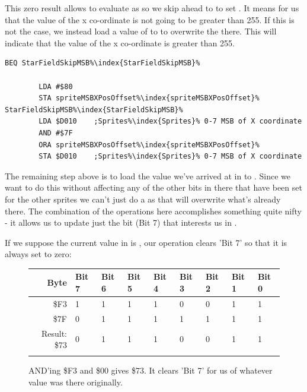This zero result allows  to evaluate as  so we skip ahead to 
to set .
It means for us that the value of the x co-ordinate is not going to be greater than 255. If this is not the case, we instead load a value of
 to  to overwrite the  there. This will indicate that the value of the x co-ordinate
is greater than 255.

\begin{lstlisting}[escapechar=\%]
        BEQ StarFieldSkipMSB%\index{StarFieldSkipMSB}%

        LDA #$80
        STA spriteMSBXPosOffset%\index{spriteMSBXPosOffset}%
StarFieldSkipMSB%\index{StarFieldSkipMSB}%   
        LDA $D010    ;Sprites%\index{Sprites}% 0-7 MSB of X coordinate
        AND #$7F
        ORA spriteMSBXPosOffset%\index{spriteMSBXPosOffset}%
        STA $D010    ;Sprites%\index{Sprites}% 0-7 MSB of X coordinate
\end{lstlisting}

The remaining step above is to load the value we've arrived at in  to . Since we
want to do this without affecting any of the other bits in there that have been set for the other sprites we can't
just do a  as that will overwrite what's already there. The combination of the  operations
here accomplishes something quite nifty - it allows us to update just the bit (Bit 7) that interests us in .

If we suppose the current value in  is , our  operation clears 'Bit 7' so that
it is always set to zero:

\begin{figure}[H]
  {
    \setlength{\tabcolsep}{3.0pt}
    \setlength\cmidrulewidth{\heavyrulewidth} %
    \begin{adjustbox}{width=10cm,center}

      \begin{tabular}{rllllllll}
        \toprule
        Byte & Bit 7 & Bit 6 & Bit 5 & Bit 4 & Bit 3 & Bit 2 & Bit 1 & Bit 0        \\
        \midrule
        \$F3 & 1 & 1 & 1 & 1 & 0 & 0 & 1 & 1 \\
        \$7F & 0 & 1 & 1 & 1 & 1 & 1 & 1 & 1 \\
        \midrule
        Result: \$73 & 0 & 1 & 1 & 1 & 0 & 0 & 1 & 1 \\
        \addlinespace
        \bottomrule
      \end{tabular}
    \end{adjustbox}
  }\caption*{AND'ing \$F3 and \$00 gives \$73. It clears 'Bit 7' for us of whatever value was there originally.}
\end{figure}

